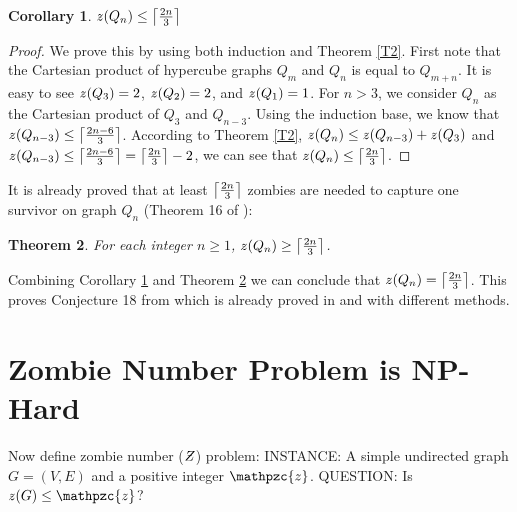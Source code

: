 \documentclass[1p]{elsarticle}
\DeclarePairedDelimiter\ceil{\lceil}{\rceil} \DeclarePairedDelimiter\floor{\lfloor}{\rfloor}
\newtheorem{theorem}{Theorem}
\newtheorem{corollary}[theorem]{Corollary}
\newcommand{\NPZ}{\ooalign{$Z$\cr\hfil\rule[.8ex]{.3em}{.09ex}\hfil\cr}}
\newcommand{\zn}{\ooalign{$z$\cr\hfil\rule[.5ex]{.2em}{.08ex}\hfil\cr}}
\begin{document}
\begin{corollary}
	\label{C3}
	$\zn(Q_{n}) \leq \ceil*{\frac{2n}{3}}$
\end{corollary}
\begin{proof}
	We prove this by using both induction and Theorem \ref{T2}. First note that the Cartesian product of
	hypercube graphs $Q_{m}$ and $Q_{n}$ is equal to $Q_{m+n}$. It is easy to see $\zn(Q_3) = 2$, $\zn(Q_2) = 2$, and
	$\zn(Q_1) = 1$. For $n > 3$, we consider $Q_n$ as the Cartesian product of $Q_3$ and $Q_{n-3}$. Using the induction
	base, we know that $\zn(Q_{n-3}) \leq \ceil*{\frac{2n - 6}{3}}$. According to Theorem \ref{T2}, $\zn(Q_n) \leq
	\zn(Q_{n-3}) + \zn(Q_3)$ and $\zn(Q_{n-3}) \leq \ceil*{\frac{2n - 6}{3}} = \ceil*{\frac{2n}{3}} - 2$, we can see that
	$\zn(Q_n) \leq \ceil*{\frac{2n}{3}}$.
\end{proof}

It is already proved that at least $\ceil*{\frac{2n}{3}}$ zombies are needed to capture one survivor on graph $Q_n$
(Theorem 16 of \cite{Fitz16}):

\begin{theorem}
	\label{T4}
	For each integer $n \geq 1$, $\zn(Q_n) \geq \ceil*{\frac{2n}{3}} $.
\end{theorem}

Combining Corollary \ref{C3} and Theorem \ref{T4} we can conclude that $\zn(Q_n) = \ceil*{\frac{2n}{3}}$.
This proves Conjecture 18 from \cite{Fitz16} which is already proved in \cite{Offner19} and \cite{Fitz18} with different methods. 

\section{Zombie Number Problem is NP-Hard}\label{np-zombienumber}
	Now define zombie number ($\NPZ$) problem:
	{\newline}
	INSTANCE: A simple undirected graph $G = (V,E)$ and a positive integer $\mathpzc{z}$.
	{\newline}
	QUESTION: Is $\zn (G) \leq \mathpzc{z}$?
\end{document}
